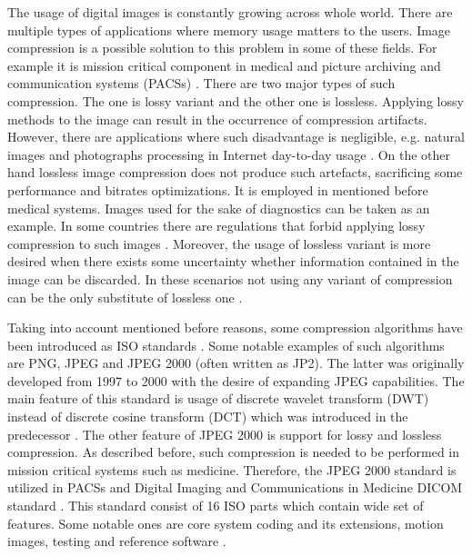 The usage of digital images is constantly growing across whole world. There are multiple types
of applications where memory usage matters to the users. Image compression is a possible solution
to this problem in some of these fields. For example it is mission critical component in medical
and picture archiving and communication systems (PACSs) \cite{entropy}. There are two major types
of such compression. The one is lossy variant and the other one is lossless. Applying lossy methods
to the image can result in the occurrence of compression artifacts. However, there are applications
where such disadvantage is negligible, e.g. natural images and photographs processing in Internet day-to-day usage \cite{img_compress}.
On the other hand lossless image compression does not produce such artefacts,
sacrificing some performance and bitrates optimizations. It is employed in mentioned before medical systems.
Images used for the sake of diagnostics can be taken as an example. In some countries there are
regulations that forbid applying lossy compression to such images \cite{entropy}. Moreover, the
usage of lossless variant is more desired when there exists some uncertainty whether information
contained in the image can be discarded. In these scenarios not using any variant of compression
can be the only substitute of lossless one \cite{entropy}.

Taking into account mentioned before reasons, some compression algorithms have been introduced as ISO
standards \cite{entropy}. Some notable examples of such algorithms are PNG, JPEG and JPEG 2000 (often written as JP2).
The latter was originally developed from 1997 to 2000 with the desire of expanding JPEG capabilities.
The main feature of this standard is usage of discrete wavelet transform (DWT) instead of discrete
cosine transform (DCT) which was introduced in the predecessor \cite{jpeg2000}. The other feature
of JPEG 2000 is support for lossy and lossless compression. As described before, such compression
is needed to be performed in mission critical systems such as medicine. Therefore, the JPEG 2000 standard
is utilized in PACSs and Digital Imaging and Communications in Medicine DICOM standard \cite{entropy}.
This standard consist of 16 ISO parts which contain wide set of features. Some notable ones are core system
coding and its extensions, motion images, testing and reference software \cite{jpeg2000}.

